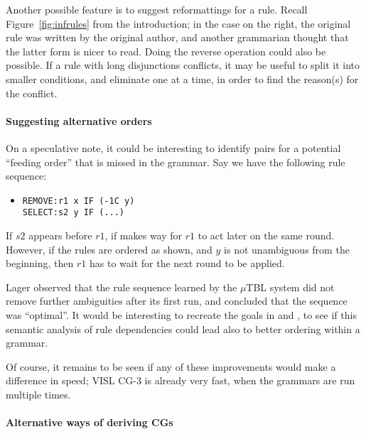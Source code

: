 {{Another possible feature is to suggest reformattings for a rule. Recall
Figure~\ref{fig:infrules} from the introduction; in the case on the right, the
original rule was written by the original author, and another
grammarian thought that the latter form is nicer to read. Doing the
reverse operation could also be possible. If a rule with long
disjunctions conflicts, it may be useful to split it into smaller
conditions, and eliminate one at a time, in order to find the
reason(s) for the conflict.


\paragraph{Suggesting alternative orders} 
On a speculative note, it could be interesting to identify pairs for a
potential ``feeding order'' that is missed in the grammar. Say we have
the following rule sequence:

\begin{itemize}
\item[]
\begin{verbatim}
REMOVE:r1 x IF (-1C y)
SELECT:s2 y IF (...)
\end{verbatim}
\end{itemize}

If $s2$ appears before $r1$, if makes way for $r1$ to act later on the
same round.  However, if the rules are ordered as shown, and $y$ is
not unambiguous from the beginning, then $r1$ has to wait for the next
round to be applied.

Lager \cite{lager01transformation} observed that the rule sequence
learned by the $\mu$TBL system did not remove further ambiguities
after its first run, and concluded that the sequence was ``optimal''.
It would be interesting to recreate the goals in
\cite{lager01transformation} and \cite{bick2013tuning}, to see if this
semantic analysis of rule dependencies could lead also to better
ordering within a grammar.

Of course, it remains to be seen if any of these improvements would
make a difference in speed; VISL CG-3 is already very fast, when the
grammars are run multiple times.

\paragraph{Alternative ways of deriving CGs}

}}
